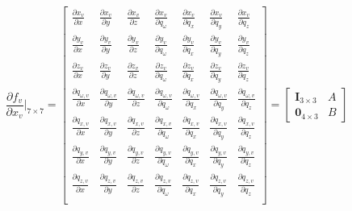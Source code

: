 \documentclass[master,korean,final]{cbnu-ecs}
\begin{document}
\[
{\frac{\partial f_v}{\partial x_v}}\bigg|_{7\times7} = \begin{bmatrix}
\frac{\partial x_v}{\partial x} 		& \frac{\partial x_v}{\partial y} 			& \frac{\partial x_v}{\partial z} 			& \frac{\partial x_v}{\partial q_\omega} 		& \frac{\partial x_v}{\partial q_x} 		& \frac{\partial x_v}{\partial q_y} 		& \frac{\partial x_v}{\partial q_z} \\
\frac{\partial y_v}{\partial x} 		& \frac{\partial y_v}{\partial y} 			& \frac{\partial y_v}{\partial z} 			& \frac{\partial y_v}{\partial q_\omega} 		& \frac{\partial y_v}{\partial q_x} 		& \frac{\partial y_v}{\partial q_y} 		& \frac{\partial y_v}{\partial q_z} \\
\frac{\partial z_v}{\partial x} 		& \frac{\partial z_v}{\partial y} 			& \frac{\partial z_v}{\partial z} 			& \frac{\partial z_v}{\partial q_\omega} 		& \frac{\partial z_v}{\partial q_x} 		& \frac{\partial z_v}{\partial q_y} 		& \frac{\partial z_v}{\partial q_z} \\
\frac{\partial q_{\omega,v}}{\partial x} & \frac{\partial q_{\omega,v}}{\partial y} 	& \frac{\partial q_{\omega,v}}{\partial z} 	& \frac{\partial q_{\omega,v}}{\partial q_\omega} & \frac{\partial q_{\omega,v}}{\partial q_x} & \frac{\partial q_{\omega,v}}{\partial q_y} & \frac{\partial q_{\omega,v}}{\partial q_z} \\
\frac{\partial q_{x,v}}{\partial x} 		& \frac{\partial q_{x,v}}{\partial y} 		& \frac{\partial q_{x,v}}{\partial z} 		& \frac{\partial q_{x,v}}{\partial q_\omega} 		& \frac{\partial q_{x,v}}{\partial q_x} 		& \frac{\partial q_{x,v}}{\partial q_y} 		& \frac{\partial q_{x,v}}{\partial q_z} \\
\frac{\partial q_{y,v}}{\partial x} 		& \frac{\partial q_{y,v}}{\partial y} 		& \frac{\partial q_{y,v}}{\partial z}		 & \frac{\partial q_{y,v}}{\partial q_\omega} 	& \frac{\partial q_{y,v}}{\partial q_x} 		& \frac{\partial q_{y,v}}{\partial q_y} 		& \frac{\partial q_{y,v}}{\partial q_z} \\
\frac{\partial q_{z,v}}{\partial x} 		& \frac{\partial q_{z,v}}{\partial y} 		& \frac{\partial q_{z,v}}{\partial z}		 & \frac{\partial q_{z,v}}{\partial q_\omega}		 & \frac{\partial q_{z,v}}{\partial q_x} 		& \frac{\partial q_{z,v}}{\partial q_y} 		& \frac{\partial q_{z,v}}{\partial q_z} \\
\end{bmatrix}
=
\begin{bmatrix}
\mathbf{I}_{3\times3} & A \\
\mathbf{0}_{4\times3} & B
\end{bmatrix}
\]
\end{document}
